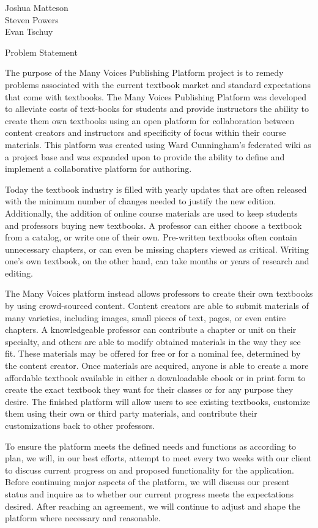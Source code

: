 \documentclass{article}
\begin{document}
    \setlength{\parindent}{0pt}
    \setlength{\parskip}{0pt}
\begingroup\flushleft
  Joshua Matteson\\
  Steven Powers\\
  Evan Tschuy
\endgroup

\setlength{\parindent}{4em}
\linespread{1.1}

\vspace{1pc}
\centerline{\sc \large Problem Statement}
\vspace{2pc}

The purpose of the Many Voices Publishing Platform project is to remedy problems 
associated with the current textbook market and standard expectations that come 
with textbooks. The Many Voices Publishing Platform was developed to alleviate 
costs of text-books for students and provide instructors the ability 
to create them own textbooks using an open platform for collaboration between 
content creators and instructors and specificity of focus within their course materials. 
This platform was created using Ward Cunningham’s federated wiki as a project 
base and was expanded upon to provide the ability to define and implement a 
collaborative platform for authoring.

Today the textbook industry is filled with yearly updates that are often released with the
minimum number of changes needed to justify the new edition. Additionally, the addition of 
online course materials are used to keep students and professors buying new textbooks. 
A professor can either choose a textbook from a catalog, or write one of their own. 
Pre-written textbooks often contain unnecessary chapters, or can even be missing chapters 
viewed as critical. Writing one's own textbook, on the other hand, can take months or 
years of research and editing.

The Many Voices platform instead allows professors to create their own textbooks 
by using crowd-sourced content. Content creators are able to submit materials of 
many varieties, including images, small pieces of text, pages, or even entire chapters. 
A knowledgeable professor can contribute a chapter or unit on their specialty, and 
others are able to modify obtained materials in the way they see fit. These materials may be
offered for free or for a nominal fee, determined by the content creator. Once materials are 
acquired, anyone is able to create a more affordable textbook available in either
a downloadable ebook or in print form to create the exact textbook they want for their classes
or for any purpose they desire. The finished platform will allow users to see existing 
textbooks, customize them using their own or third party materials, and contribute their 
customizations back to other professors.

To ensure the platform meets the defined needs and functions as according to plan, 
we will, in our best efforts, attempt to meet every two weeks with our client to 
discuss current progress on and proposed functionality for the application. 
Before continuing major aspects of the platform, we will discuss our present 
status and inquire as to whether our current progress meets the expectations 
desired. After reaching an agreement, we will continue to adjust and shape 
the platform where necessary and reasonable.
\end{document}
